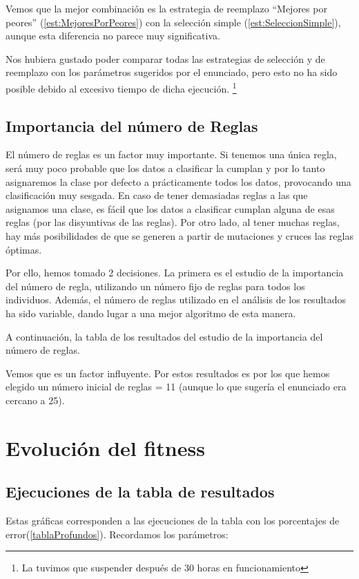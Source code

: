 \documentclass[nochap]{apuntes}
\begin{document}
Vemos que la mejor combinación es la estrategia de reemplazo ``Mejores por peores'' (\ref{est:MejoresPorPeores}) con la selección simple (\ref{est:SeleccionSimple}), aunque esta diferencia no parece muy significativa.

Nos hubiera gustado poder comparar todas las estrategias de selección y de reemplazo con los parámetros sugeridos por el enunciado, pero esto no ha sido posible debido al excesivo tiempo de dicha ejecución. \footnote{La tuvimos que suspender después de 30 horas en funcionamiento}

\subsection{Importancia del número de Reglas}
\label{subsec:numReglas}

El número de reglas es un factor muy importante. Si tenemos una única regla, será muy poco probable que los datos a clasificar la cumplan y por lo tanto asignaremos la clase por defecto a prácticamente todos los datos, provocando una clasificación muy sesgada. En caso de tener demasiadas reglas a las que asignamos una clase, es fácil que los datos a clasificar cumplan alguna de esas reglas (por las disyuntivas de las reglas). Por otro lado, al tener muchas reglas, hay más posibilidades de que se generen a partir de mutaciones y cruces las reglas óptimas.

Por ello, hemos tomado 2 decisiones. La primera es el estudio de la importancia del número de regla, utilizando un número fijo de reglas para todos los individuos. Además, el número de reglas utilizado en el análisis de los resultados ha sido variable,  dando lugar a una mejor algoritmo de esta manera.

A continuación, la tabla de los resultados del estudio de la importancia del número de reglas.



Vemos que es un factor influyente. Por estos resultados es por los que hemos elegido un número inicial de reglas = 11 (aunque lo que sugería el enunciado era cercano a 25).


\section{Evolución del fitness}

\label{sec:evolucionFitness}

\subsection{Ejecuciones de la tabla de resultados}
Estas gráficas corresponden a las ejecuciones de la tabla con los porcentajes de error(\ref{tablaProfundos}). Recordamos los parámetros:
\end{document}
